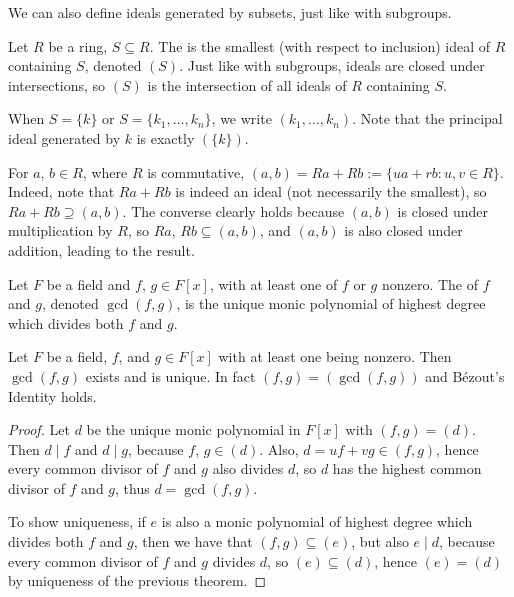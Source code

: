 We can also define ideals generated by subsets, just like with subgroups.

\begin{defbox}
    Let $R$ be a ring, $S \subseteq R$. The  is the smallest (with respect to inclusion) ideal of $R$ containing $S$, denoted $(S)$. Just like with subgroups, ideals are closed under intersections, so $(S)$ is the intersection of all ideals of $R$ containing $S$.
\end{defbox}

When $S = \{k\}$ or $S = \{k_1, \dots, k_n\}$, we write $(k_1, \dots, k_n)$. Note that the principal ideal generated by $k$ is exactly $(\{k\})$.

\begin{example}
    For $a$, $b \in R$, where $R$ is commutative, $(a,b) = Ra + Rb := \{ua + rb : u,v \in R\}$. Indeed, note that $Ra + Rb$ is indeed an ideal (not necessarily the smallest), so $Ra + Rb \supseteq (a,b)$. The converse clearly holds because $(a,b)$ is closed under multiplication by $R$, so $Ra$, $Rb \subseteq (a,b)$, and $(a,b)$ is also closed under addition, leading to the result.
\end{example}

\begin{defbox}
    Let $F$ be a field and $f$, $g \in F[x]$, with at least one of $f$ or $g$ nonzero. The  of $f$ and $g$, denoted $\gcd(f,g)$, is the unique monic polynomial of highest degree which divides both $f$ and $g$. 
\end{defbox}

\begin{corrbox}
    Let $F$ be a field, $f$, and $g \in F[x]$ with at least one being nonzero. Then $\gcd(f,g)$ exists and is unique. In fact $(f,g) = (\gcd(f,g))$ and Bézout's Identity holds.
\end{corrbox}

\begin{proof}
    Let $d$ be the unique monic polynomial in $F[x]$ with $(f,g) = (d)$. Then $d \mid f$ and $d \mid g$, because $f$, $g \in (d)$. Also, $d = uf + vg \in (f,g)$, hence every common divisor of $f$ and $g$ also divides $d$, so $d$ has the highest common divisor of $f$ and $g$, thus $d = \gcd(f,g)$. 

    To show uniqueness, if $e$ is also a monic polynomial of highest degree which divides both $f$ and $g$, then we have that $(f,g) \subseteq (e)$, but also $e \mid d$, because every common divisor of $f$ and $g$ divides $d$, so $(e) \subseteq (d)$, hence $(e) = (d)$ by uniqueness of the previous theorem. 
\end{proof}

